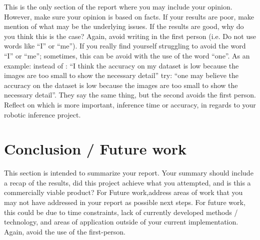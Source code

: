\documentclass[10pt,journal,compsoc]{IEEEtran}
\begin{document}
This is the only section of the report where you may include your opinion. However, make sure your opinion is based on facts. If your results are poor, make mention of what may be the underlying issues. If the results are good, why do you think this is the case? Again, avoid writing in the first person (i.e. Do not use words like “I” or “me”). If you really find yourself struggling to avoid the word “I” or “me”; sometimes, this can be avoid with the use of the word “one”. As an example: instead of : “I think the accuracy on my dataset is low because the images are too small to show the necessary detail” try: “one may believe the accuracy on the dataset is low because the images are too small to show the necessary detail”. They say the same thing, but the second avoids the first person. 
Reflect on which is more important, inference time or accuracy, in regards to your robotic inference project.

\section{Conclusion / Future work}
This section is intended to summarize your report. Your summary should include a recap of the results, did this project achieve what you attempted, and is this a commercially viable product? 
For Future work,address areas of work that you may not have addressed in your report as possible next steps. For future work, this could be due to time constraints, lack of currently developed methods / technology, and areas of application outside of your current implementation. Again, avoid the use of the first-person.



\end{document}
